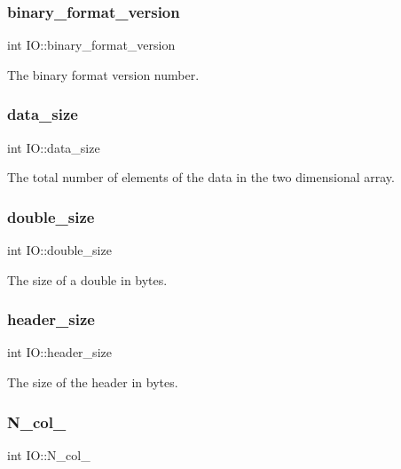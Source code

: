 \subsubsection{\texorpdfstring{binary\+\_\+format\+\_\+version}{binary\_format\_version}}
{\footnotesize\ttfamily int I\+O\+::binary\+\_\+format\+\_\+version}

The binary format version number. \mbox{\label{class_i_o_a39a8a0474a288522d847f6be0fb2403f}} 
\subsubsection{\texorpdfstring{data\+\_\+size}{data\_size}}
{\footnotesize\ttfamily int I\+O\+::data\+\_\+size}

The total number of elements of the data in the two dimensional array. \mbox{\label{class_i_o_a3af3bf77eacd18c1c50cbf78b46c4228}} 
\subsubsection{\texorpdfstring{double\+\_\+size}{double\_size}}
{\footnotesize\ttfamily int I\+O\+::double\+\_\+size}

The size of a double in bytes. \mbox{\label{class_i_o_aee540c40b18d5f9990bf8d7e12cb0827}} 
\subsubsection{\texorpdfstring{header\+\_\+size}{header\_size}}
{\footnotesize\ttfamily int I\+O\+::header\+\_\+size}

The size of the header in bytes. \mbox{\label{class_i_o_a64aae2d2be35348233f8ddac4d6791f2}} 
\subsubsection{\texorpdfstring{N\+\_\+col\+\_\+}{N\_col\_}}
{\footnotesize\ttfamily int I\+O\+::\+N\+\_\+col\+\_\+}

